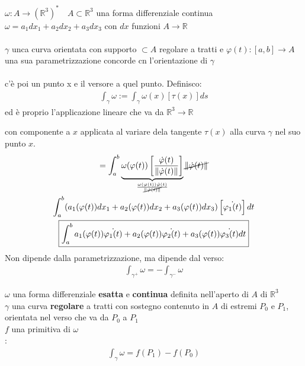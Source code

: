 \documentclass[a4paper, oneside]{article}
\begin{document}
\begin{proposition}
     $\omega : A \to (\mathbb{R}^3)^* \quad A \subset \mathbb{R}^3$ una forma differenziale continua\\
     $\omega = a_1 dx_1 + a_2 dx_2 + a_3 dx_3$ con $dx$ funzioni $A \to \mathbb{R}$\\\\
     $\gamma$ unca curva orientata con supporto $\subset A$ regolare a tratti e  $\varphi(t):[a,b] \to A$ una sua parametrizzazione concorde cn l'orientazione di $\gamma$\\\\
    c'è poi un punto x e il versore a quel punto.
    Definisco:
    \begin{gather*}
        \int_{\gamma} \omega := \int_{\gamma} \omega(x) [\tau(x)] ds
    \end{gather*}
    ed è proprio l'applicazione lineare che va da $\mathbb{R}^3 \to \mathbb{R}$
\end{proposition} con componente a $x$ applicata al variare dela tangente $\tau(x)$ alla curva $\gamma$ nel suo punto $x$.
\begin{gather*}
    = \int_{a}^{b} \underbrace{\omega(\varphi(t)) \left[ \frac{\dot{\varphi}(t) }{\left\lVert \dot{\varphi}(t)  \right\rVert }\right]}_{\frac{\omega(\varphi(t)) \dot{\varphi}(t)}{ \cancel{\left\lVert \dot{\varphi}(t) \right\rVert} }} \cancel{\left\lVert \dot{\varphi}(t) \right\rVert } \\
    \int_{a}^{b} (a_1(\varphi(t)) dx_1 + a_2(\varphi(t)) dx_2 + a_3(\varphi(t)) dx_3)\left[ \dot{\varphi_1(t)} \right] dt\\
    \boxed{\int_{a}^{b} a_1(\varphi(t)) \dot{\varphi_1(t)} + a_2(\varphi(t)) \dot{\varphi_2(t)} + a_3(\varphi(t)) \dot{\varphi_3(t)} dt}
\end{gather*}
Non dipende dalla parametrizzazione, ma dipende dal verso:
\begin{gather*}
    \int_{\gamma^+} \omega = -\int_{\gamma^-} \omega
\end{gather*}


\begin{theorem}
     $\omega$ una forma differenziale \textbf{esatta} e \textbf{continua} definita nell'aperto di $A$ di $\mathbb{R}^3$\\
     $\gamma$ una curva \textbf{regolare} a tratti con sostegno contenuto in $A$ di estremi $P_0$ e $P_1$, orientata nel verso che va da $P_0$ a $P_1$\\
     $f$ una primitiva di $\omega$\\
    :
    \begin{gather*}
        \int_{\gamma} \omega = f(P_1) - f(P_0) 
    \end{gather*}
\end{theorem}
\end{document}
